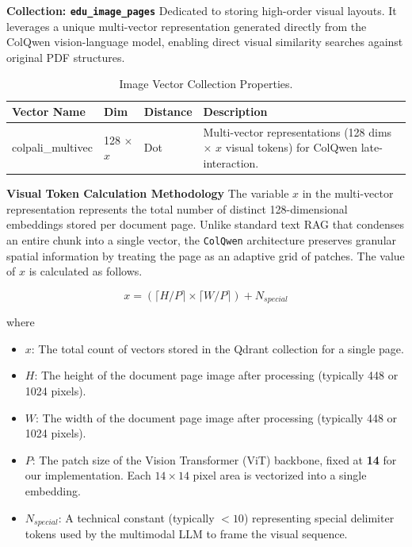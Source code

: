 \textbf{Collection: \texttt{edu\_image\_pages}}
Dedicated to storing high-order visual layouts. It leverages a unique multi-vector representation generated directly from the ColQwen vision-language model, enabling direct visual similarity searches against original PDF structures.
\begin{table}[H]
    \centering
    \caption{Image Vector Collection Properties.}
    \label{tab:qdrant_image}
    \begin{tabular}{lp{1.5cm}p{1.8cm}p{5.5cm}}
        \toprule
        \textbf{Vector Name} & \textbf{Dim} & \textbf{Distance} & \textbf{Description} \\
        \midrule
        colpali\_multivec & 128 $\times$ $x$ & Dot & Multi-vector representations (128 dims $\times$ $x$ visual tokens) for ColQwen late-interaction. \\
        \bottomrule
    \end{tabular}
\end{table}

\textbf{Visual Token Calculation Methodology}
The variable $x$ in the multi-vector representation represents the total number of distinct 128-dimensional embeddings stored per document page. Unlike standard text RAG that condenses an entire chunk into a single vector, the \texttt{ColQwen} architecture preserves granular spatial information by treating the page as an adaptive grid of patches. The value of $x$ is calculated as follows.

\begin{equation}
    x = \left( \lceil H / P \rceil \times \lceil W / P \rceil \right) + N_{special}
\end{equation}

where
\begin{itemize}
    \item \textbf{$x$}: The total count of vectors stored in the Qdrant collection for a single page.
    \item \textbf{$H$}: The height of the document page image after processing (typically 448 or 1024 pixels).
    \item \textbf{$W$}: The width of the document page image after processing (typically 448 or 1024 pixels).
    \item \textbf{$P$}: The patch size of the Vision Transformer (ViT) backbone, fixed at \textbf{14} for our implementation. Each $14 \times 14$ pixel area is vectorized into a single embedding.
    \item \textbf{$N_{special}$}: A technical constant (typically $< 10$) representing special delimiter tokens used by the multimodal LLM to frame the visual sequence.
\end{itemize}

